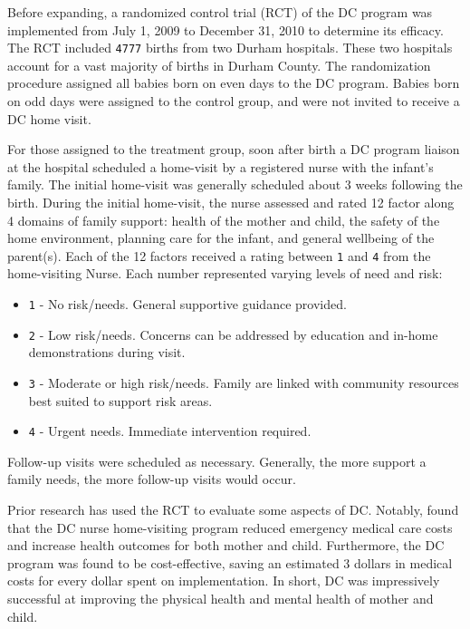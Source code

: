 \documentclass[12pt,letterpaperpaper,]{book}
\providecommand{\tightlist}{%
  \setlength{\itemsep}{0pt}\setlength{\parskip}{0pt}}
\begin{document}
Before expanding, a randomized control trial (RCT) of the DC program was
implemented from July 1, 2009 to December 31, 2010 to determine its
efficacy. The RCT included \texttt{4777} births from two Durham
hospitals. These two hospitals account for a vast majority of births in
Durham County. The randomization procedure assigned all babies born on
even days to the DC program. Babies born on odd days were assigned to
the control group, and were not invited to receive a DC home visit.

For those assigned to the treatment group, soon after birth a DC program
liaison at the hospital scheduled a home-visit by a registered nurse
with the infant's family. The initial home-visit was generally scheduled
about 3 weeks following the birth. During the initial home-visit, the
nurse assessed and rated 12 factor along 4 domains of family support:
health of the mother and child, the safety of the home environment,
planning care for the infant, and general wellbeing of the parent(s).
Each of the 12 factors received a rating between \texttt{1} and
\texttt{4} from the home-visiting Nurse. Each number represented varying
levels of need and risk:

\begin{itemize}
\tightlist
\item
  \texttt{1} - No risk/needs. General supportive guidance provided.
\item
  \texttt{2} - Low risk/needs. Concerns can be addressed by education
  and in-home demonstrations during visit.
\item
  \texttt{3} - Moderate or high risk/needs. Family are linked with
  community resources best suited to support risk areas.
\item
  \texttt{4} - Urgent needs. Immediate intervention required.
\end{itemize}

Follow-up visits were scheduled as necessary. Generally, the more
support a family needs, the more follow-up visits would occur.

Prior research has used the RCT to evaluate some aspects of DC. Notably,
\citet{dodge_implementation_2013} found that the DC nurse home-visiting
program reduced emergency medical care costs and increase health
outcomes for both mother and child. Furthermore, the DC program was
found to be cost-effective, saving an estimated 3 dollars in medical
costs for every dollar spent on implementation. In short, DC was
impressively successful at improving the physical health and mental
health of mother and child.
\end{document}
